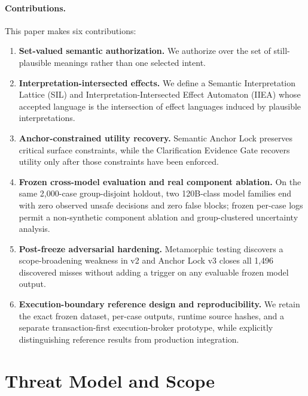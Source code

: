 \paragraph{Contributions.}
This paper makes six contributions:
\begin{enumerate}
  \item \textbf{Set-valued semantic authorization.} We authorize over the set of still-plausible meanings rather than one selected intent.
  \item \textbf{Interpretation-intersected effects.} We define a Semantic Interpretation Lattice (SIL) and Interpretation-Intersected Effect Automaton (IIEA) whose accepted language is the intersection of effect languages induced by plausible interpretations.
  \item \textbf{Anchor-constrained utility recovery.} Semantic Anchor Lock preserves critical surface constraints, while the Clarification Evidence Gate recovers utility only after those constraints have been enforced.
  \item \textbf{Frozen cross-model evaluation and real component ablation.} On the same 2,000-case group-disjoint holdout, two 120B-class model families end with zero observed unsafe \allow decisions and zero false blocks; frozen per-case logs permit a non-synthetic component ablation and group-clustered uncertainty analysis.
  \item \textbf{Post-freeze adversarial hardening.} Metamorphic testing discovers a scope-broadening weakness in v2 and Anchor Lock v3 closes all 1,496 discovered misses without adding a trigger on any evaluable frozen model output.
  \item \textbf{Execution-boundary reference design and reproducibility.} We retain the exact frozen dataset, per-case outputs, runtime source hashes, and a separate transaction-first execution-broker prototype, while explicitly distinguishing reference results from production integration.
\end{enumerate}

\section{Threat Model and Scope}


